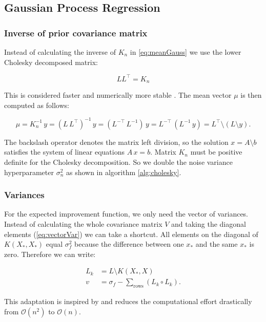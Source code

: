 \subsection{Gaussian Process Regression}

\subsubsection{Inverse of prior covariance matrix}

Instead of calculating the inverse of $K_n$ in \eqref{eq:meanGauss} we use the lower Cholesky decomposed matrix:

$$LL^\top=K_n$$

This is considered faster and numerically more stable \cite{rasmussen2006gaussian}. The mean vector $\mu$ is then computed as follows:

\begin{equation} \label{eq:regression}
    \mu = K_n^{-1}\,y = (L\,L^{\top})^{-1}\,y = (L^{-\top}\,L^{-1})\,y = L^{-\top}\,(L^{-1}\,y) = L^{\top}\setminus(L \setminus y).
\end{equation}

The backslash operator denotes the matrix left division, so the solution $x=A\setminus b$ satisfies the system of linear equations $A\,x=b$.
Matrix $K_n$ must be positive definite for the Cholesky decomposition. So we double the noise variance hyperparameter $\sigma_n^2$ as shown in algorithm \ref{alg:cholesky}.

\subsubsection{Variances}

For the expected improvement function, we only need the vector of variances. Instead of calculating the whole covariance matrix $V$ and taking the diagonal elements (\ref{eq:vectorVar}) we can take a shortcut. All elements on the diagonal of $K(X_*,X_*)$ equal $\sigma_f^2$ because the difference between one $x_*$ and the same $x_*$ is zero. Therefore we can write:

\begin{align}
    L_k &= L \setminus K(X_*,X) \\
    v &= \sigma_f - \sum_{\text{rows}} (L_k \circ L_k). \label{eq:vectorvar}
\end{align}

This adaptation is inspired by \cite{nandoCode} and reduces the computational effort drastically from $\mathcal{O}(n^2)$ to $\mathcal{O}(n)$.

